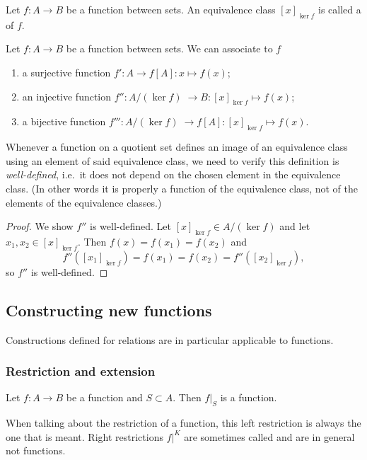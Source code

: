 \begin{definition}
Let $f: A\to B$ be a function between sets. An equivalence class $[x]_{\ker f}$ is called a  of $f$.
\end{definition}

\begin{proposition}
Let $f:A\to B$ be a function between sets. We can associate to $f$
\begin{enumerate}
\item a surjective function $f': A\to f[A]: x\mapsto f(x)$;
\item an injective function $f'': A/(\ker f) \;\to B: [x]_{\ker f}\mapsto f(x)$;
\item a bijective function $f''': A/(\ker f) \;\to f[A]: [x]_{\ker f}\mapsto f(x)$.
\end{enumerate}
\end{proposition}
Whenever a function on a quotient set defines an image of an equivalence class using an element of said equivalence class, we need to verify this definition is \emph{well-defined}, i.e.\ it does not depend on the chosen element in the equivalence class. (In other words it is properly a function of the equivalence class, not of the elements of the equivalence classes.)
\begin{proof}
We show $f''$ is well-defined. Let $[x]_{\ker f}\in A/(\ker f)$ and let $x_1,x_2\in [x]_{\ker f}$. Then $f(x) = f(x_1) = f(x_2)$ and
\[ f''([x_1]_{\ker f}) = f(x_1) = f(x_2) = f''([x_2]_{\ker f}), \]
so $f''$ is well-defined.
\end{proof}



\subsection{Constructing new functions}
Constructions defined for relations are in particular applicable to functions.

\subsubsection{Restriction and extension}
\begin{lemma}
Let $f: A\to B$ be a function and $S\subset A$. Then $f|_S$ is a function.
\end{lemma}
When talking about the restriction of a function, this left restriction is always the one that is meant. Right restrictions $f|^K$ are sometimes called  and are in general not functions.

